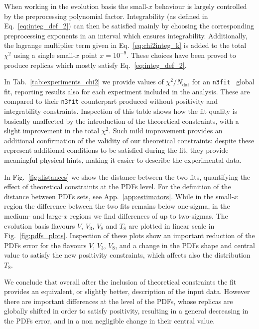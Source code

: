 
%
When working in the evolution basis the small-$x$ behaviour is largely controlled by the preprocessing
polynomial factor. Integrability (as defined in Eq.~\eqref{eq:integ_def_2})
can then be satisfied mainly by choosing the corresponding preprocessing exponents in an interval which ensures integrability.
Additionally, the lagrange multiplier term given in Eq.~\eqref{eq:chi2integ_k} is added to the
total $\chi^2$ using a single small-$x$ point $x=10^{-9}$. These choices have been proved to
produce replicas which mostly satisfy Eq.~\eqref{eq:integ_def_2}. 

%
In Tab.~\ref{tab:experiments_chi2} we provide values of $\chi^2/N_{\text{dat}}$ for an {\tt n3fit } global fit,
reporting results also for each experiment included in the analysis.
These are compared to their {\tt n3fit} counterpart produced without positivity and integrability constraints. 
Inspection of this table shows how the fit quality is basically unaffected by the introduction of the
theoretical constraints, with a slight improvement in the total $\chi^2$. Such mild improvement provides an
additional confirmation of the validity of our theoretical constraints: despite these represent additional 
conditions to be satisfied during the fit, they provide meaningful physical hints, making it easier to describe 
the experimental data.
 
%
In Fig.~\ref{fig:distances} we show the distance between the two fits, quantifying the effect of theoretical
constraints at the PDFs level. For the definition of the distance between PDFs sets, see App.~\ref{app:estimators}.
While in the small-$x$ region the difference between the two fits remains below 
one-sigma, in the medium- and large-$x$ regions we find differences of up to
two-sigmas. The evolution basis flavours $V$, $V_3$, $V_8$ and $T_8$ are plotted in linear scale in Fig.~\ref{fig:pdfs_plots}.
Inspection of these plots show an important reduction of the PDFs error for the flavours $V$, $V_3$, $V_8$,
and a change in the PDFs shape and central value to satisfy the new positivity constraints, which affects also the distribution
$T_8$.

%
We conclude that overall after the inclusion of theoretical constraints the fit provides an equivalent,
or slightly better, description of the input data. However there are important differences at the level of the PDFs,
whose replicas are globally shifted in order to satisfy positivity, resulting in a general decreasing in the PDFs error,
and in a non negligible change in their central value.

